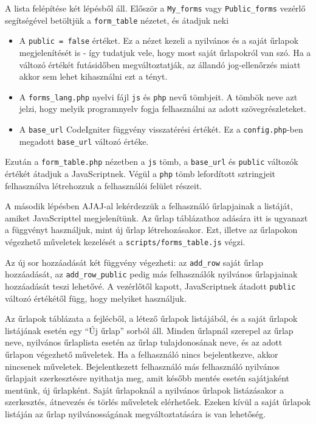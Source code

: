 \documentclass[12pt,a4paper,twoside]{article}
\begin{document}
A lista felépítése két lépésből áll. Először a \texttt{My\_forms} vagy
\texttt{Public\_forms} vezérlő
segítségével betöltjük a \texttt{form\_table} nézetet, és átadjuk neki
\begin{itemize}
\item A \texttt{public = false} értéket. Ez a nézet kezeli a nyilvános és a
  saját űrlapok megjelenítését is - így tudatjuk vele, hogy most saját
  űrlapokról van szó. Ha a változó értékét futásidőben megváltoztatják, az
  állandó jog-ellenőrzés miatt akkor sem lehet kihasználni ezt a tényt.
\item A \texttt{forms\_lang.php} nyelvi fájl \texttt{js} és \texttt{php} nevű
  tömbjeit. A tömbök neve azt jelzi, hogy melyik programnyelv fogja felhasználni
  az adott szövegrészleteket.
\item A \texttt{base\_url} CodeIgniter függvény visszatérési értékét. Ez a
  \texttt{config.php}-ben megadott \texttt{base\_url} változó értéke.
\end{itemize}

Ezután a \texttt{form\_table.php} nézetben a \texttt{js} tömb, a
\texttt{base\_url} és \texttt{public} változók értékét átadjuk a
JavaScriptnek. Végül a \texttt{php} tömb lefordított sztringjeit felhasználva
létrehozzuk a felhasználói felület részeit.

\vspace{1cm}

A második lépésben AJAJ-al lekérdezzük a felhasználó űrlapjainak
a listáját, amiket JavaScripttel megjelenítünk. Az űrlap táblázathoz adására
itt is ugyanazt a függvényt használjuk, mint új űrlap létrehozásakor. Ezt,
illetve az űrlapokon végezhető műveletek kezelését a
\texttt{scripts/forms\_table.js} végzi.

Az új sor hozzáadását két függvény végezheti: az \texttt{add\_row} saját űrlap
hozzáadását, az \texttt{add\_row\_public} pedig más felhasználók nyilvános
űrlapjainak hozzáadását teszi lehetővé. A vezérlőtől kapott, JavaScriptnek
átadott \texttt{public} változó értékétől függ, hogy melyiket használjuk.

Az űrlapok táblázata a fejlécből, a létező űrlapok listájából, és a saját
űrlapok listájának esetén egy ``Új űrlap'' sorból áll. Minden űrlapnál szerepel
az űrlap neve, nyilvános űrlaplista esetén az űrlap tulajdonosának neve, és az
adott űrlapon végezhető műveletek. Ha a felhasználó nincs bejelentkezve, akkor
nincsenek műveletek. Bejelentkezett felhasználó más felhasználó nyilvános űrlapjait
szerkesztésre nyithatja meg, amit később mentés esetén sajátjaként mentünk, új
űrlapként. Saját űrlapoknál a nyilvános űrlapok listázásakor a szerkesztés,
átnevezés és törlés műveletek elérhetőek. Ezeken kívül a saját űrlapok listáján
az űrlap nyilvánosságának megváltoztatására is van lehetőség.
\end{document}
